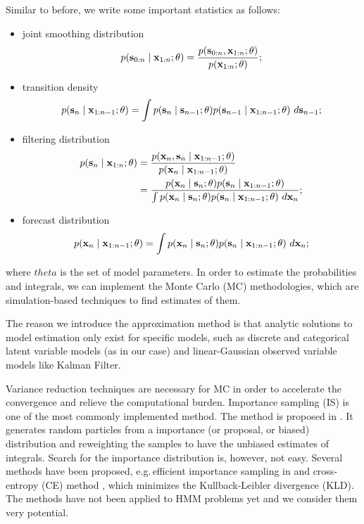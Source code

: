 Similar to before, we write some important statistics as follows:
		\begin{itemize}
		\item joint smoothing distribution
			\begin{equation}
			\label{eq:PF:smoothing}
			p({\mathbf s}_{0:n} \mid {\mathbf x}_{1:n};\theta) = \frac{p({\mathbf s}_{0:n},{\mathbf x}_{1:n};\theta)}{p({\mathbf x}_{1:n};\theta)};
			\end{equation}
		\item transition density
			\begin{equation}
			\label{eq:PF:transition}
			p(\bs_n \mid \bx_{1:n-1};\theta) = \int p(\bs_n \mid \bs_{n-1};\theta)
				p(\bs_{n-1} \mid \bx_{1:n-1};\theta)\ d\bs_{n-1};
			\end{equation}
		\item filtering distribution
			\begin{equation}
			\label{eq:PF:filtering}
			\begin{aligned}
			p({\mathbf s}_n \mid {\mathbf x}_{1:n};\theta) & = 
				\frac{p({\mathbf x}_n,{\mathbf s}_n \mid {\mathbf x}_{1:n-1};\theta)}{p({\mathbf x}_n \mid {\mathbf x}_{1:n-1};\theta)} \\
			& = \frac{p({\mathbf x}_n \mid {\mathbf s}_n;\theta)p({\mathbf s}_n \mid {\mathbf x}_{1:n-1};\theta)}
				{\int p({\mathbf x}_n \mid {\mathbf s}_n;\theta)p({\mathbf s}_n \mid {\mathbf x}_{1:n-1};\theta)\ d{\mathbf x}_n};
			\end{aligned}
			\end{equation}
		\item forecast distribution
			\begin{equation}
			\label{eq:PF:forecast}
			p(\bx_n \mid \bx_{1:n-1};\theta) = \int p(\bx_n \mid \bs_n;\theta)
				p(\bs_n \mid \bx_{1:n-1};\theta)\ d\bx_n;
			\end{equation}
		\end{itemize}
where $theta$ is the set of model parameters.
In order to estimate the probabilities and integrals,
we can implement the Monte Carlo (MC) methodologies,
which are simulation-based techniques to find estimates of them.

The reason we introduce the approximation method is that
analytic solutions to model estimation only exist for specific models,
such as discrete and categorical latent variable models (as in our case)
and linear-Gaussian observed variable models like Kalman Filter.

Variance reduction techniques are necessary for MC in order to 
accelerate the convergence and relieve the computational burden.
Importance sampling (IS) is one of the most commonly implemented method.
The method is proposed in \cite{Kahn:1953me,Marshall:1954us}.
It generates random particles from a importance (or proposal, or biased) distribution
and reweighting the samples to have the unbiased estimates of integrals.
Search for the importance distribution is, however, not easy.
Several methods have been proposed, 
e.g.\,efficient importance sampling in \cite{Richard:2007gz} and
cross-entropy (CE) method \cite{Rubinstein:2013ce,Gao:2015vv},
which minimizes the Kullback-Leibler divergence (KLD).
The methods have not been applied to HMM problems yet and we consider them very potential.

